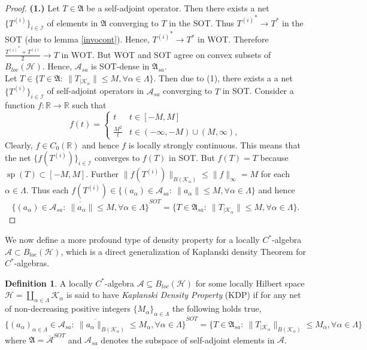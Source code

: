 \documentclass[10pt]{article}
\theoremstyle{definition}
\newtheorem{definition}{Definition}[section]
\begin{document}
	\begin{proof}
		{\bf (1.)} Let $T\in \mathfrak A$ be a self-adjoint operator. Then there exists a net $\{T^{(i)}\}_{i\in \mathcal I}$ of elements in $\mathfrak A$ converging to $T$ in the SOT. Thus ${T^{(i)}}^* \longrightarrow T^*$ in the SOT (due to lemma \ref{invocont}). Hence, ${T^{(i)}}^*\longrightarrow T^*$ in WOT. Therefore $\frac{{T^{(i)}}^*+T^{(i)}}{2}\longrightarrow T$ in WOT. But WOT and SOT agree on convex subsets of $B_{loc}(\mathcal H)$. Hence, $\mathcal A_{sa}$ is SOT-dense in $\mathfrak A_{sa}$.\\
		
	 Let $T\in \bigl\{T\in \mathfrak  A:~\|T_{|\mathcal K_\alpha}\|\leq M, \forall \alpha\in \Lambda\bigr\}$. Then due to (1), there exists a a net $\{T^{(i)}\}_{i\in \mathcal I}$ of self-adjoint operators in $\mathcal A_{sa}$ converging to $T$ in SOT. Consider a function $f:\mathbb R\to \mathbb R$ such that \begin{equation}
			f(t)=\begin{cases}
				t & t\in [-M,M]\\ \frac{M^2}{t} & t\in(-\infty, -M)\cup (M,\infty),
			\end{cases}
		\end{equation}
		Clearly, $f\in C_0(\mathbb R)$ and hence $f$ is locally strongly continuous. This means that the net $\{f(T^{(i)})\}_{i\in \mathcal I}$ converges to $f(T)$ in SOT. But $f(T)=T$ because $\operatorname{sp}(T)\subset [-M,M]$. Further $\|f(T^{(i)})\|_{B(\mathcal K_\alpha)}\leq \|f\|_\infty=M$ for each $\alpha\in \Lambda$. Thus each $f(T^{(i)})\in \bigl\{(a_\alpha)\in \mathcal A_{sa}:~\|a_\alpha\|\leq M, \forall \alpha\in \Lambda\bigr\}$ and hence $$\overline{\bigl\{(a_\alpha)\in \mathcal A_{sa}:~\|a_\alpha\|\leq M, \forall \alpha\in \Lambda\bigr\}}^{SOT}=\bigl\{T\in \mathfrak  A_{sa}:~\|T_{|\mathcal K_\alpha}\|\leq M, \forall \alpha\in \Lambda\bigr\}.$$
	\end{proof}
\noindent	We now define a more profound type of density property for a locally $C^*$-algebra $\mathcal A\subset B_{loc}(\mathcal H)$, which is a direct generalization of Kaplanski density Theorem for $C^*$-algebras. 
	\begin{definition}
		A locally $C^*$-algebra $\mathcal A\subseteq B_{loc}(\mathcal H)$ for some locally Hilbert space $\mathcal H=\coprod_{\alpha\in \Lambda} \mathcal K_\alpha$ is said to have \emph{Kaplanski Density Property} (KDP) if for any net of non-decreasing positive integers $\{M_\alpha\}_{\alpha\in \Lambda}$ the following holds true, $$\overline{\bigl\{(a_\alpha)_{\alpha\in \Lambda}\in \mathcal A_{sa}:~\|a_\alpha\|_{B(\mathcal K_\alpha)}\leq M_\alpha, \forall \alpha\in \Lambda\bigr\}}^{SOT}=\bigl\{T\in \mathfrak A_{sa}:~\|T_{|\mathcal K_\alpha}\|_{B(\mathcal K_\alpha)}\leq M_\alpha, \forall \alpha\in \Lambda\bigr\}$$ where $\mathfrak A=\overline{\mathcal A}^{SOT}$ and $\mathcal A_{sa}$ denotes the subspace of self-adjoint elements in $\mathcal A$.
	\end{definition}
\end{document}
